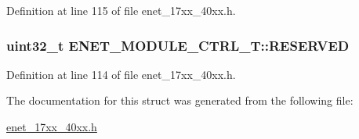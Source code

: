 Definition at line 115 of file enet\+\_\+17xx\+\_\+40xx.\+h.

\subsubsection[{\texorpdfstring{R\+E\+S\+E\+R\+V\+ED}{RESERVED}}]{\setlength{\rightskip}{0pt plus 5cm}uint32\+\_\+t E\+N\+E\+T\+\_\+\+M\+O\+D\+U\+L\+E\+\_\+\+C\+T\+R\+L\+\_\+\+T\+::\+R\+E\+S\+E\+R\+V\+ED}\hypertarget{structENET__MODULE__CTRL__T_a511b82f8a23341a28b95e615d75580ef}{}\label{structENET__MODULE__CTRL__T_a511b82f8a23341a28b95e615d75580ef}


Definition at line 114 of file enet\+\_\+17xx\+\_\+40xx.\+h.



The documentation for this struct was generated from the following file\+:\begin{DoxyCompactItemize}
\item 
\hyperlink{enet__17xx__40xx_8h}{enet\+\_\+17xx\+\_\+40xx.\+h}\end{DoxyCompactItemize}
